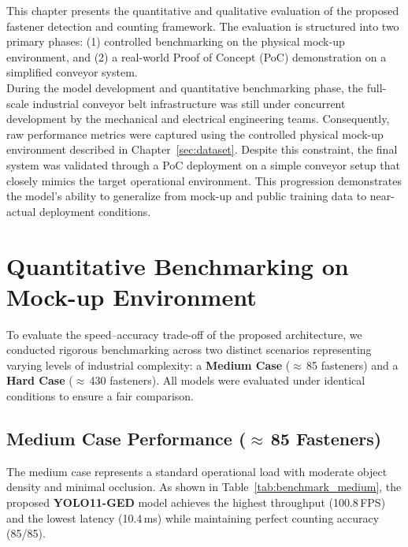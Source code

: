 \label{chap:results}

This chapter presents the quantitative and qualitative evaluation of the proposed fastener detection and counting framework. The evaluation is structured into two primary phases: (1) controlled benchmarking on the physical mock-up environment, and (2) a real-world Proof of Concept (PoC) demonstration on a simplified conveyor system. \\

During the model development and quantitative benchmarking phase, the full-scale industrial conveyor belt infrastructure was still under concurrent development by the mechanical and electrical engineering teams. Consequently, raw performance metrics were captured using the controlled physical mock-up environment described in Chapter~\ref{sec:dataset}. Despite this constraint, the final system was validated through a PoC deployment on a simple conveyor setup that closely mimics the target operational environment. This progression demonstrates the model's ability to generalize from mock-up and public training data to near-actual deployment conditions.

\section{Quantitative Benchmarking on Mock-up Environment}
To evaluate the speed--accuracy trade-off of the proposed architecture, we conducted rigorous benchmarking across two distinct scenarios representing varying levels of industrial complexity: a \textbf{Medium Case} ($\approx$\,85 fasteners) and a \textbf{Hard Case} ($\approx$\,430 fasteners). All models were evaluated under identical conditions to ensure a fair comparison.

\subsection{Medium Case Performance ($\approx$\,85 Fasteners)}
The medium case represents a standard operational load with moderate object density and minimal occlusion. As shown in Table~\ref{tab:benchmark_medium}, the proposed \textbf{YOLO11-GED} model achieves the highest throughput (100.8\,FPS) and the lowest latency (10.4\,ms) while maintaining perfect counting accuracy (85/85).

